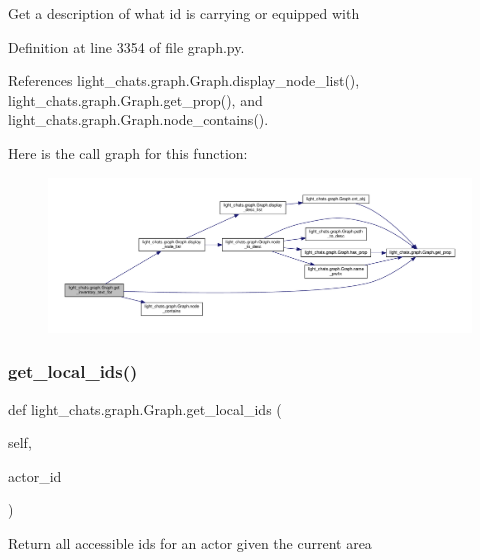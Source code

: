 \begin{DoxyVerb}Get a description of what id is carrying or equipped with\end{DoxyVerb}
 

Definition at line 3354 of file graph.\+py.



References light\+\_\+chats.\+graph.\+Graph.\+display\+\_\+node\+\_\+list(), light\+\_\+chats.\+graph.\+Graph.\+get\+\_\+prop(), and light\+\_\+chats.\+graph.\+Graph.\+node\+\_\+contains().

Here is the call graph for this function\+:
\nopagebreak
\begin{figure}[H]
\begin{center}
\leavevmode
\includegraphics[width=350pt]{classlight__chats_1_1graph_1_1Graph_a8f2b0882918768e199aee89cf08bde41_cgraph}
\end{center}
\end{figure}
\mbox{\label{classlight__chats_1_1graph_1_1Graph_a4fa84ee088a8086336cf51a1c41a0477}} 
\subsubsection{\texorpdfstring{get\+\_\+local\+\_\+ids()}{get\_local\_ids()}}
{\footnotesize\ttfamily def light\+\_\+chats.\+graph.\+Graph.\+get\+\_\+local\+\_\+ids (\begin{DoxyParamCaption}\item[{}]{self,  }\item[{}]{actor\+\_\+id }\end{DoxyParamCaption})}

\begin{DoxyVerb}Return all accessible ids for an actor given the current area\end{DoxyVerb}
 

